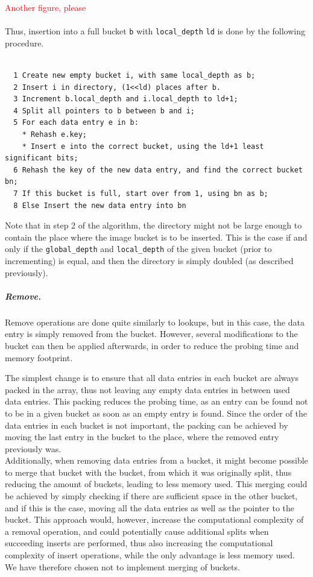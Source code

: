 \documentclass[11pt]{article} %
\begin{document}
\textcolor{red}{Another figure, please}\\
\\
Thus, insertion into a full bucket \verb|b| with \verb|local_depth| \verb|ld| is done by the following procedure.
\begin{lstlisting}[frame=single]  % Start your code-block

  1 Create new empty bucket i, with same local_depth as b;
  2 Insert i in directory, (1<<ld) places after b.
  3 Increment b.local_depth and i.local_depth to ld+1;
  4 Split all pointers to b between b and i;
  5 For each data entry e in b:
    * Rehash e.key;
    * Insert e into the correct bucket, using the ld+1 least significant bits;
  6 Rehash the key of the new data entry, and find the correct bucket bn;
  7 If this bucket is full, start over from 1, using bn as b;
  8 Else Insert the new data entry into bn
\end{lstlisting}
Note that in step 2 of the algorithm, the directory might not be large enough to contain the place where the image bucket is to be inserted. This is the case if and only if the \verb|global_depth| and \verb|local_depth| of the given bucket (prior to incrementing) is equal, and then the directory is simply doubled (as described previously).

\subparagraph{Remove.} Remove operations are done quite similarly to lookups, but in this case, the data entry is simply removed from the bucket. However, several modifications to the bucket can then be applied afterwards, in order to reduce the probing time and memory footprint.

The simplest change is to ensure that all data entries in each bucket are always packed in the array, thus not leaving any empty data entries in between used data entries. This packing reduces the probing time, as an entry can be found not to be in a given bucket as soon as an empty entry is found. Since the order of the data entries in each bucket is not important, the packing can be achieved by moving the last entry in the bucket to the place, where the removed entry previously was.\\

Additionally, when removing data entries from a bucket, it might become possible to merge that bucket with the bucket, from which it was originally split, thus reducing the amount of buckets, leading to less memory used. This merging could be achieved by simply checking if there are sufficient space in the other bucket, and if this is the case, moving all the data entries as well as the pointer to the bucket. This approach would, however, increase the computational complexity of a removal operation, and could potentially cause additional splits when succeeding inserts are performed, thus also increasing the computational complexity of insert operations, while the only advantage is less memory used. We have therefore chosen not to implement merging of buckets.
\end{document}
